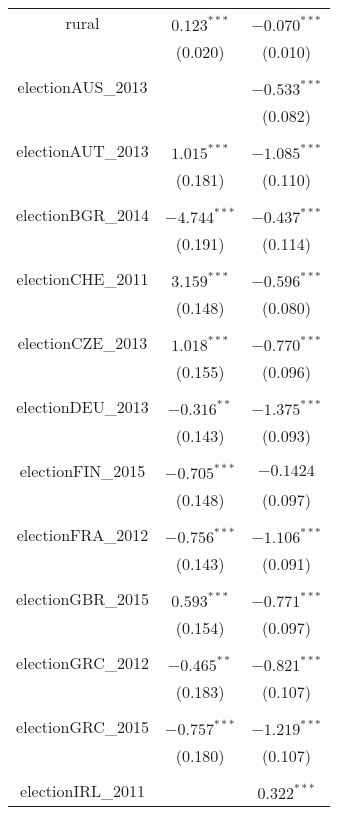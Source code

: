 \documentclass[12pt, titlepage]{article}
\begin{document}
\begin{longtable}[H]{ccc }
		rural & $0.123^{***}$ & $-0.070^{***}$ \\ 
		& (0.020) & (0.010) \\ 
		& & \\ 
		electionAUS\_2013 &  & $-0.533^{***}$ \\ 
		&  & (0.082) \\ 
		& & \\ 
		electionAUT\_2013 & $1.015^{***}$ & $-1.085^{***}$ \\ 
		& (0.181) & (0.110) \\ 
		& & \\ 
		electionBGR\_2014 & $-4.744^{***}$ & $-0.437^{***}$ \\ 
		& (0.191) & (0.114) \\ 
		& & \\ 
		electionCHE\_2011 & $3.159^{***}$ & $-0.596^{***}$ \\ 
		& (0.148) & (0.080) \\ 
		& & \\ 
		electionCZE\_2013 & $1.018^{***}$ & $-0.770^{***}$ \\ 
		& (0.155) & (0.096) \\ 
		& & \\ 
		electionDEU\_2013 & $-0.316^{**}$ & $-1.375^{***}$ \\ 
		& (0.143) & (0.093) \\ 
		& & \\ 
		electionFIN\_2015 & $-0.705^{***}$ & $-0.1424$ \\ 
		& (0.148) & (0.097) \\ 
		& & \\ 
		electionFRA\_2012 & $-0.756^{***}$ & $-1.106^{***}$ \\ 
		& (0.143) & (0.091) \\ 
		& & \\ 
		electionGBR\_2015 & $0.593^{***}$ & $-0.771^{***}$ \\ 
		& (0.154) & (0.097) \\ 
		& & \\ 
		electionGRC\_2012 & $-0.465^{**}$ & $-0.821^{***}$ \\ 
		& (0.183) & (0.107) \\ 
		& & \\ 
		electionGRC\_2015 & $-0.757^{***}$ & $-1.219^{***}$ \\ 
		& (0.180) & (0.107) \\ 
		& & \\ 
		electionIRL\_2011 &  & $0.322^{***}$ \\ 

\end{longtable}
\end{document}
